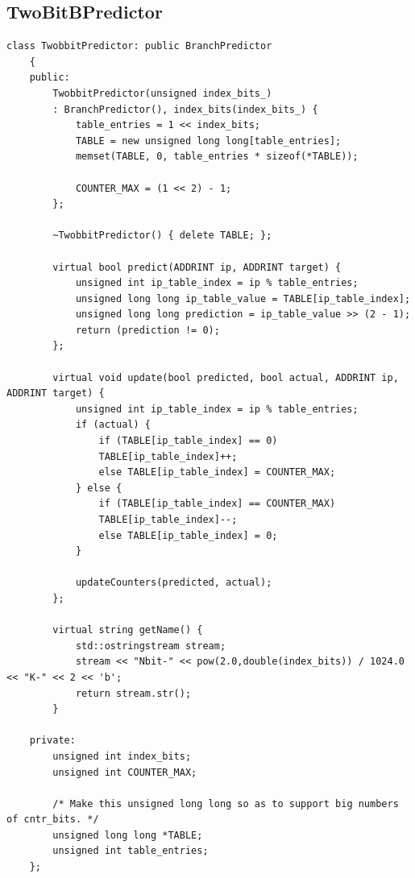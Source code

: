\documentclass{article}
\newcommand{\eng}[1]{\foreignlanguage{english}{#1}}
\begin{document}
\subsection{\eng{TwoBitBPredictor}}
\begin{lstlisting}[style=Cstyle]
    class TwobbitPredictor: public BranchPredictor
    {
    public:
        TwobbitPredictor(unsigned index_bits_)
        : BranchPredictor(), index_bits(index_bits_) {
            table_entries = 1 << index_bits;
            TABLE = new unsigned long long[table_entries];
            memset(TABLE, 0, table_entries * sizeof(*TABLE));

            COUNTER_MAX = (1 << 2) - 1;
        };

        ~TwobbitPredictor() { delete TABLE; };

        virtual bool predict(ADDRINT ip, ADDRINT target) {
            unsigned int ip_table_index = ip % table_entries;
            unsigned long long ip_table_value = TABLE[ip_table_index];
            unsigned long long prediction = ip_table_value >> (2 - 1);
            return (prediction != 0);
        };

        virtual void update(bool predicted, bool actual, ADDRINT ip, ADDRINT target) {
            unsigned int ip_table_index = ip % table_entries;
            if (actual) {
                if (TABLE[ip_table_index] == 0)
                TABLE[ip_table_index]++;
                else TABLE[ip_table_index] = COUNTER_MAX;
            } else {
                if (TABLE[ip_table_index] == COUNTER_MAX)
                TABLE[ip_table_index]--;
                else TABLE[ip_table_index] = 0;
            }

            updateCounters(predicted, actual);
        };

        virtual string getName() {
            std::ostringstream stream;
            stream << "Nbit-" << pow(2.0,double(index_bits)) / 1024.0 << "K-" << 2 << 'b';
            return stream.str();
        }

    private:
        unsigned int index_bits;
        unsigned int COUNTER_MAX;

        /* Make this unsigned long long so as to support big numbers of cntr_bits. */
        unsigned long long *TABLE;
        unsigned int table_entries;
    };
\end{lstlisting}
\clearpage
\end{document}

